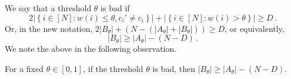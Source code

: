 \documentclass{theoretics}
\def\abs#1{\left| #1 \right|}
\begin{document}
	We say that a threshold $\theta$ is bad if
	\[
	2\left| \left\{ i \in [N] \colon  w(i) \leq \theta, c_i' \neq c_i \right\} \right| + \left| \left\{ i \in [N] \colon  w(i) > \theta \right\} \right| \geq D \, .
	\]
	Or, in the new notation, $2| B_{\theta}| + (N - (|A_\theta| + |B_{\theta}|)) \geq D$, or equivalently,  
	\[
	\abs{B_{\theta}} \geq \abs{A_{\theta}} - (N-D) \, .
	\]
	We note the above in the following observation.
	
	\begin{observation} \label{obs:undecodable}
		For a fixed $\theta \in [0,1]$, if the threshold $\theta$ is bad, then $\abs{B_{\theta}} \geq \abs{A_{\theta}} - (N-D)$.
	\end{observation}
	
\end{document}
